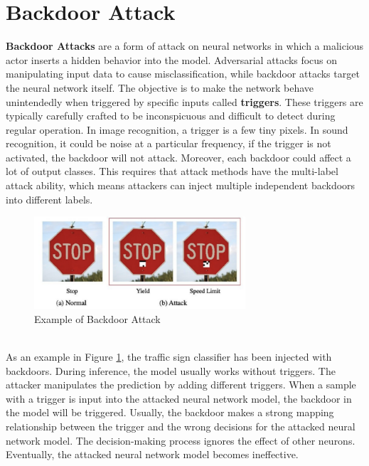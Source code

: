 \documentclass[english,version-2022-01]{uzl-thesis}
\begin{document}
    \section{Backdoor Attack}\label{backdoorattack} \textbf{Backdoor Attacks} are a form of attack on neural networks in which a malicious actor inserts a hidden behavior into the model. Adversarial attacks focus on manipulating input data to cause misclassification, while backdoor attacks target the neural network itself. The objective is to make the network behave unintendedly when triggered by specific inputs called \textbf{triggers}. These triggers are typically carefully crafted to be inconspicuous and difficult to detect during regular operation.\cite{poisoning} In image recognition, a trigger is a few tiny pixels. In sound recognition, it could be noise at a particular frequency, if the trigger is not activated, the backdoor will not attack. Moreover, each backdoor could affect a lot of output classes. This requires that attack methods have the multi-label attack ability, which means attackers can inject multiple independent backdoors into different labels.\\
\begin{figure}[htpb]
  \centering
  \includegraphics[width=0.7\textwidth]{pic/stop.png}
  \caption{Example of Backdoor Attack\cite{poisoning}}
  \label{example of backdoor attack}
\end{figure}\\
As an example in Figure \ref{example of backdoor attack}, the traffic sign classifier has been injected with backdoors. During inference, the model usually works without triggers. The attacker manipulates the prediction by adding different triggers. When a sample with a trigger is input into the attacked neural network model, the backdoor in the model will be triggered. Usually, the backdoor makes a strong mapping relationship between the trigger and the wrong decisions for the attacked neural network model. The decision-making process ignores the effect of other neurons. Eventually, the attacked neural network model becomes ineffective.
\end{document}

